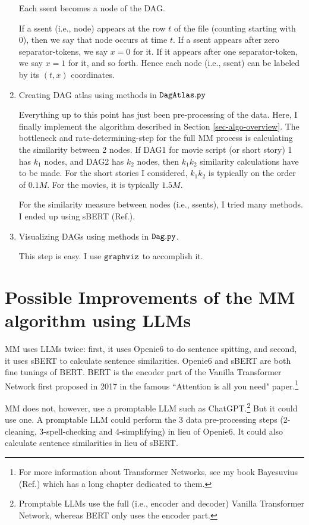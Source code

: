 \documentclass[12pt]{article}
\begin{document}
\begin{enumerate}
Each ssent becomes a node of the DAG.

If  a ssent (i.e., node) appears at the
row $t$ of the file (counting starting with 0), then 
we say that node occurs at time $t$. If a ssent appears after zero separator-tokens, we say $x=0$ for it.
If it appears after one separator-token, we say $x=1$ for it, and so forth. Hence each node (i.e., ssent)
can be labeled by its $(t,x)$ coordinates.


\item Creating DAG atlas using methods in
$\tt DagAtlas.py$

Everything up to this point has just been
pre-processing of the data. 
Here, I finally implement the algorithm described
in Section \ref{sec-algo-overview}.
The bottleneck and rate-determining-step for
the full MM process is
calculating the similarity between 2 nodes.
If DAG1 for movie script (or short story) 1 has $k_1$ 
nodes, and DAG2 has $k_2$ nodes,
then $k_1 k_2$ similarity calculations have to be made.
For the short stories I considered, $k_1k_2$
is typically on the order of $0.1M$.
For the movies, it is typically $1.5M$.

For the similarity measure between nodes (i.e., ssents), I tried 
many methods. I
ended up using sBERT (Ref.\cite{sbert}). 

\item Visualizing DAGs using methods in $\tt Dag.py$.

This step is easy. I use $\tt graphviz$ to 
accomplish it.

\end{enumerate}

\section{Possible Improvements
of the MM algorithm
using LLMs}

MM uses 
LLMs twice: first, 
it uses Openie6
to do sentence spitting,
and second, it uses 
sBERT to calculate sentence
similarities.
Openie6 and sBERT are both
fine tunings of BERT.
BERT is the encoder 
part of the Vanilla Transformer
Network
first proposed in 2017 in the famous ``Attention is all you need" paper.\footnote{For more information about Transformer Networks,
see my book Bayesuvius (Ref.\cite{bayesuvius}) which
has a long chapter dedicated
to them.}


MM does not, however, use 
a promptable LLM such as
ChatGPT.\footnote{
Promptable LLMs use the full (i.e., encoder and decoder)
Vanilla Transformer Network, whereas BERT only uses the encoder part.} 
But it could use one.
A promptable
LLM could perform
the 3 data pre-processing steps
(2-cleaning, 3-spell-checking and 4-simplifying) in lieu of 
Openie6. It could also calculate sentence similarities in lieu of sBERT.
\end{document}
